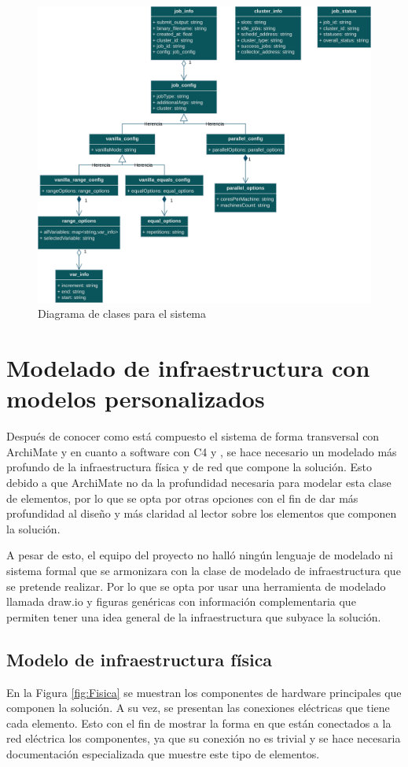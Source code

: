 \begin{figure}[H]
	\centering
	\includegraphics[scale=0.1]{tablas-images/UML/Diagramas HTCondor-Objetos.drawio.png}
	\caption{Diagrama de clases para el sistema}
    \label{fig:UMLClases}
\end{figure}

\section{Modelado de infraestructura con modelos personalizados}
Después de conocer como está compuesto el sistema de forma transversal con ArchiMate y en cuanto a software con C4 y \UML, se hace necesario un modelado más profundo de la infraestructura física y de red que compone la solución. Esto debido a que ArchiMate no da la profundidad necesaria para modelar esta clase de elementos, por lo que se opta por otras opciones con el fin de dar más profundidad al diseño y más claridad al lector sobre los elementos que componen la solución.

A pesar de esto, el equipo del proyecto no halló ningún lenguaje de modelado ni sistema formal que se armonizara con la clase de modelado de infraestructura que se pretende realizar. Por lo que se opta por usar una herramienta de modelado llamada draw.io y figuras genéricas con información complementaria que permiten tener una idea general de la infraestructura que subyace la solución.

\subsection{Modelo de infraestructura física}
\noindent
En la Figura \ref{fig:Fisica} se muestran los componentes de hardware principales que componen la solución. A su vez, se presentan las conexiones eléctricas que tiene cada elemento. Esto con el fin de mostrar la forma en que están conectados a la red eléctrica los componentes, ya que su conexión no es trivial y se hace necesaria documentación especializada que muestre este tipo de elementos.


